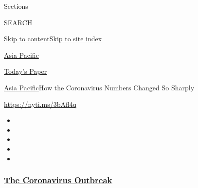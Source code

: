 Sections

SEARCH

\protect\hyperlink{site-content}{Skip to
content}\protect\hyperlink{site-index}{Skip to site index}

\href{https://www.nytimes3xbfgragh.onion/section/world/asia}{Asia
Pacific}

\href{https://myaccount.nytimes3xbfgragh.onion/auth/login?response_type=cookie\&client_id=vi}{}

\href{https://www.nytimes3xbfgragh.onion/section/todayspaper}{Today's
Paper}

\href{/section/world/asia}{Asia Pacific}\textbar{}How the Coronavirus
Numbers Changed So Sharply

\url{https://nyti.ms/3bAfl4q}

\begin{itemize}
\item
\item
\item
\item
\item
\end{itemize}

\hypertarget{the-coronavirus-outbreak}{%
\subsubsection{\texorpdfstring{\href{https://www.nytimes3xbfgragh.onion/news-event/coronavirus?name=styln-coronavirus-national\&region=TOP_BANNER\&block=storyline_menu_recirc\&action=click\&pgtype=Article\&impression_id=9768dee0-f2bb-11ea-a9c4-bbcb0334804d\&variant=undefined}{The
Coronavirus
Outbreak}}{The Coronavirus Outbreak}}\label{the-coronavirus-outbreak}}

